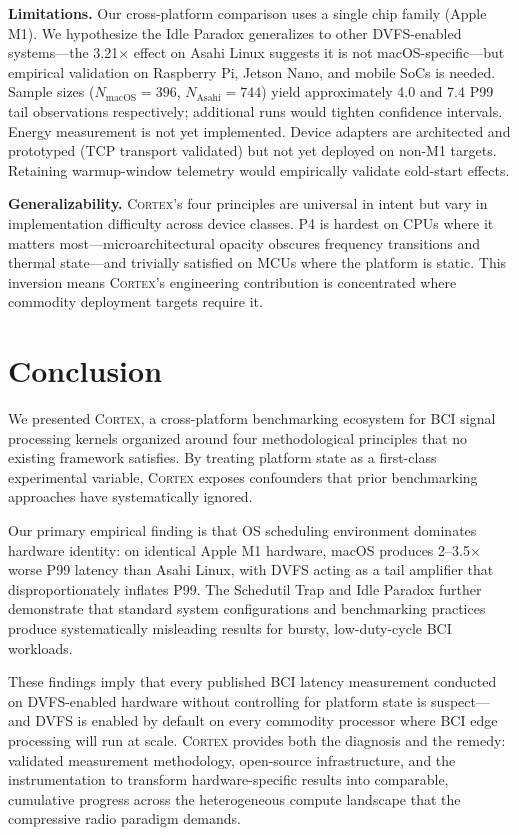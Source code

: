 \documentclass[sigplan,10pt]{acmart}
\newcommand{\cortex}{\textsc{Cortex}}
\begin{document}
\textbf{Limitations.} Our cross-platform comparison uses a single chip family (Apple M1). We hypothesize the Idle Paradox generalizes to other DVFS-enabled systems---the 3.21$\times$ effect on Asahi Linux suggests it is not macOS-specific---but empirical validation on Raspberry Pi, Jetson Nano, and mobile SoCs is needed. Sample sizes ($N_{\text{macOS}}=396$, $N_{\text{Asahi}}=744$) yield approximately 4.0 and 7.4 P99 tail observations respectively; additional runs would tighten confidence intervals. Energy measurement is not yet implemented. Device adapters are architected and prototyped (TCP transport validated) but not yet deployed on non-M1 targets. Retaining warmup-window telemetry would empirically validate cold-start effects.

\textbf{Generalizability.} \cortex{}'s four principles are universal in intent but vary in implementation difficulty across device classes. P4 is hardest on CPUs where it matters most---microarchitectural opacity obscures frequency transitions and thermal state---and trivially satisfied on MCUs where the platform is static. This inversion means \cortex{}'s engineering contribution is concentrated where commodity deployment targets require it.


\section{Conclusion}

We presented \cortex{}, a cross-platform benchmarking ecosystem for BCI signal processing kernels organized around four methodological principles that no existing framework satisfies. By treating platform state as a first-class experimental variable, \cortex{} exposes confounders that prior benchmarking approaches have systematically ignored.

Our primary empirical finding is that OS scheduling environment dominates hardware identity: on identical Apple M1 hardware, macOS produces 2--3.5$\times$ worse P99 latency than Asahi Linux, with DVFS acting as a tail amplifier that disproportionately inflates P99. The Schedutil Trap and Idle Paradox further demonstrate that standard system configurations and benchmarking practices produce systematically misleading results for bursty, low-duty-cycle BCI workloads.

These findings imply that every published BCI latency measurement conducted on DVFS-enabled hardware without controlling for platform state is suspect---and DVFS is enabled by default on every commodity processor where BCI edge processing will run at scale. \cortex{} provides both the diagnosis and the remedy: validated measurement methodology, open-source infrastructure, and the instrumentation to transform hardware-specific results into comparable, cumulative progress across the heterogeneous compute landscape that the compressive radio paradigm demands.




\end{document}
